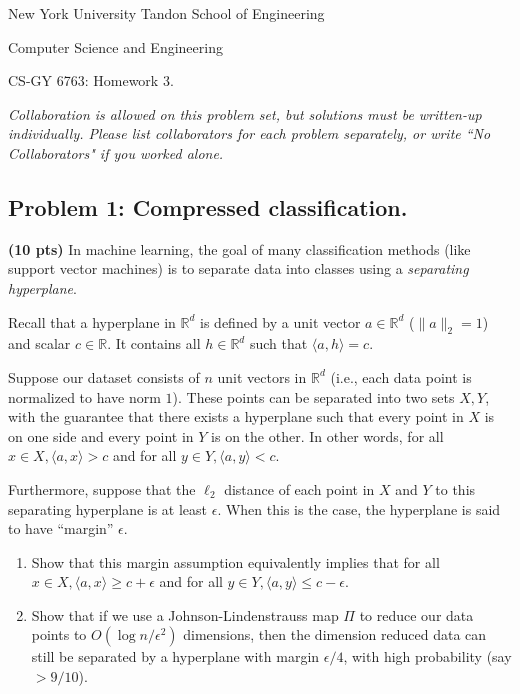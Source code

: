 \documentclass[10pt]{article}
\newcommand{\R}{\mathbb{R}}
\begin{document}
	
\begin{center}
	\normalsize
	New York University Tandon School of Engineering
	
	Computer Science and Engineering
	\medskip
	
	\large
	CS-GY 6763: Homework 3. 
	
	\medskip
	
	\normalsize 
	\noindent \emph{Collaboration is allowed on this problem set, but solutions must be written-up individually. Please list collaborators for each problem separately, or write ``No Collaborators" if you worked alone.}
	\medskip
\end{center} 



\subsection{Problem 1: Compressed classification.}
\textbf{(10 pts)} In machine learning, the goal of many classification methods (like support vector machines) is to separate data into classes using a \emph{separating hyperplane}.

Recall that a hyperplane in $\R^d$ is defined by a unit vector $a \in \R^d$ ($\|a\|_2 = 1$) and scalar $c \in \R$. It contains all  $h \in \R^d$ such that $\langle a, h\rangle = c$. 

Suppose our dataset consists of $n$ unit vectors in $\R^d$ (i.e., each data point is normalized to have norm $1$). These points can be separated into two sets $X, Y$,
with the guarantee that there exists a hyperplane such that every point in $X$ is on one side and every point in 
$Y$ is on the other. In other words, for all $x\in X, \langle a, x\rangle > c$ and for all $y\in Y, \langle a, y\rangle < c$.

Furthermore, suppose that the $\ell_2$ distance of each point in $X$ and $Y$ to this separating hyperplane is at least $\epsilon$. When this is the case, the hyperplane is said to have ``margin'' $\epsilon$. 

\begin{enumerate}
	\item Show that this margin assumption equivalently implies that for all $x\in X, \langle a, x\rangle \geq c + \epsilon$ and for all $y\in Y, \langle a, y\rangle \leq c - \epsilon$.
	
	\item Show that if we use a Johnson-Lindenstrauss map $\Pi$ to reduce our data points to $O(\log n/\epsilon^2)$ dimensions, then the dimension reduced data can still be separated by a hyperplane with margin $\epsilon/4$, with high probability (say $> 9/10$).
\end{enumerate}
\end{document}
